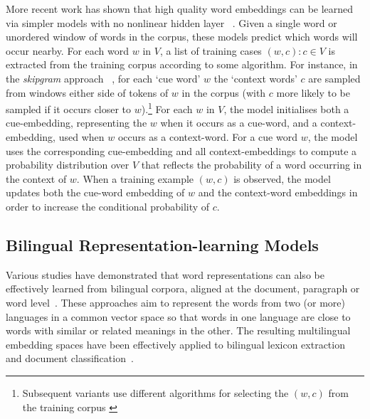 More recent work has shown that high quality word embeddings can be learned via simpler models
with no nonlinear hidden layer ~\cite{mikolov2013distributed,Pennington2014}. Given a single word or unordered window of words in the corpus, these models predict which words will occur nearby. For each word \( w\) in \(V\), a list of training cases \({(w,c) : c \in V }\) is extracted from the training corpus according to some algorithm.  For instance, in the \emph{skipgram}
approach ~\cite{mikolov2013distributed}, for each `cue word' \(w\) the `context words' \(c\) are sampled
from windows either side of tokens of \(w\) in the corpus (with \(c\) more
likely to be sampled if it occurs closer to \(w\)).\footnote{
    Subsequent variants use different algorithms for selecting the
    \((w,c)\) from the training corpus \cite{Hill2014EMNLP,levy2014dependency}
} For each \(w\) in \( V\), the model initialises both a
cue-embedding, representing the \(w\) when it occurs as a cue-word, and a
context-embedding, used when \(w\) occurs as a context-word. For a cue word
\(w\), the model uses the corresponding cue-embedding and all
context-embeddings to compute a probability distribution over \(V\) that
reflects the probability of a word occurring in the context of \(w\). When a
training example \((w,c)\) is observed, the model updates both the cue-word
embedding of \(w\) and the context-word embeddings in order to increase the
conditional probability of \(c\). 

\subsection{Bilingual Representation-learning Models}
Various studies have demonstrated that word representations can also be effectively learned from bilingual corpora, aligned at the document, paragraph or word level~\cite{Haghighi2008Learning,vulic2011identifying,mikolov2013exploiting,Hermann:2014:ICLR,lauly2014autoencoder}. These approaches aim to represent the words from two (or more) languages in a common vector space so that words in one language are close to words with similar or related meanings in the other. The resulting multilingual embedding spaces have been effectively applied to bilingual lexicon extraction~\cite{Haghighi2008Learning,vulic2011identifying,mikolov2013exploiting} and document classification~\cite{Klementiev,Hermann:2014:ICLR,lauly2014autoencoder,Kocisky:2014}.

